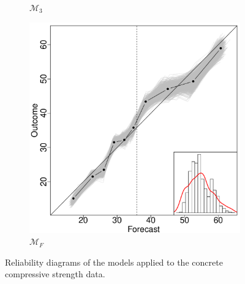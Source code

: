 \documentclass[11pt]{article}
\theoremstyle{definition}
\theoremstyle{definition}
\begin{document}
\begin{figure}
\begin{subfigure}[b]{0.24\textwidth}
                \caption{$\mathcal{M}_3$}
                \label{fig:tiger}
        \end{subfigure}
                \begin{subfigure}[b]{0.24\textwidth}
                \includegraphics[width=\textwidth]{IndependentModelF}
                \caption{$\mathcal{M}_F$}
                \label{RelDiagramNoF}
        \end{subfigure}           
        \caption{Reliability diagrams of the models applied to the concrete compressive strength data.}
                
                \label{RelDiagramMo}
\end{figure}
\end{document}
